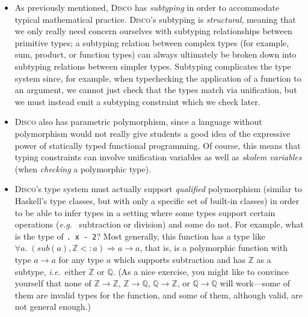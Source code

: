 \documentclass[submission,copyright,creativecommons]{eptcs}
\newcommand{\disco}{\textsc{Disco}\xspace}
\newcommand{\ie}{\emph{i.e.}\ }
\newcommand{\eg}{\emph{e.g.}\ }
\newcommand{\Z}{\mathbb{Z}}
\newcommand{\Q}{\mathbb{Q}}
\begin{document}
\begin{itemize}
\item As previously mentioned, \disco has \emph{subtyping} in order to
  accommodate typical mathematical practice.  \disco's subtyping is
  \emph{structural}, meaning that we only really need concern
  ourselves with subtyping relationships between primitive types; a
  subtyping relation between complex types (for example, sum, product,
  or function types) can always ultimately be broken down into
  subtyping relations between simpler types.  Subtyping complicates
  the type system since, for example, when typechecking the
  application of a function to an argument, we cannot just check that
  the types match via unification, but we must instead emit a
  subtyping constraint which we check later.

\item \disco also has parametric polymorphism, since a language
  without polymorphism would not really give students a good idea of
  the expressive power of statically typed functional programming.  Of
  course, this means that typing constraints can involve unification
  variables as well as \emph{skolem variables} (when \emph{checking} a
  polymorphic type).

\item \disco's type system must actually support \emph{qualified}
  polymorphism (similar to Haskell's type classes, but with only a
  specific set of built-in classes) in order to be able to infer types
  in a setting where some types support certain operations (\eg
  subtraction or division) and some do not.  For example, what is the
  type of \texttt{\x. x - 2}?  Most generally, this function
  has a type like
  $\forall a.\; (\textit{sub}(a), \Z <: a) \Rightarrow a \to a$, that
  is, is a polymorphic function with type $a \to a$ for any type $a$
  which supports subtraction and has $\Z$ as a subtype, \ie either
  $\Z$ or $\Q$.  (As a nice exercise, you might like to convince
  yourself that none of $\Z \to \Z$, $\Z \to \Q$, $\Q \to \Z$, or $\Q
  \to \Q$ will work---some of them are invalid types for the function,
  and some of them, although valid, are not general enough.)


\end{itemize}
\end{document}
